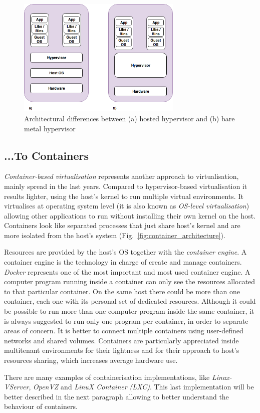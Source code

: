 \documentclass[a4paper,12pt]{article}
\def\myfig#1{Fig.~#1\xspace}
\begin{document}
\begin{figure}[ht!]
  \centerline{\includegraphics[width=0.7\textwidth]{difference_bare_metal_hosted_hypervisor.png}}
  \caption{Architectural differences between (a) hosted hypervisor and (b) bare metal hypervisor}
  \label{fig:hypervisor_difference}
  \end{figure}


\subsection{...To Containers}

\textit{Container-based virtualisation} represents another approach to
virtualisation, mainly spread in the last years. Compared to hypervisor-based
virtualisation it results lighter, using the host's kernel to run multiple
virtual environments. It virtualises at operating system level (it is also known
as \textit{OS-level virtualisation}) allowing other applications to run without
installing their own kernel on the host. Containers look like separated
processes that just share host's kernel and are more isolated from the host's
system (\myfig{\ref{fig:container_architecture}}). \par Resources are provided
by the host's OS together with the \textit{container engine}. A container engine
is the technology in charge of create and manage containers. \textit{Docker}
represents one of the most important and most used container engine. A computer
program running inside a container can only see the resources allocated to that
particular container. On the same host there could be more than one container,
each one with its personal set of dedicated resources. Although it could be
possible to run more than one computer program inside the same container, it is
always suggested to run only one program per container, in order to separate
areas of concern. It is better to connect multiple containers using user-defined
networks and shared volumes. Containers are particularly appreciated inside
multitenant environments for their lightness and for their approach to host's
resources sharing, which increases average hardware use.\par There are many
examples of containerisation implementations, like \textit{Linux-VServer},
\textit{OpenVZ} and \textit{LinuX Container (LXC)}. This last implementation
will be better described in the next paragraph allowing to better understand the
behaviour of containers. 
\end{document}
